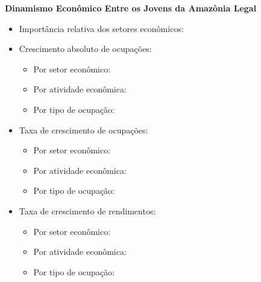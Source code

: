 \documentclass[10pt]{beamer}
\begin{document}
\begin{frame}[label=indice_principal_amz_jovem]{}

\textit{\hyperlink{indice_principal}{}}

\textbf{Dinamismo Econômico Entre os Jovens da Amazônia Legal}
\vspace{2mm}

\begin{itemize}

\item{Importância relativa dos setores econômicos: \hyperlink{_amz_jovem_importancia_relativa}{}}
\vspace{1mm}

\item{Crescimento  absoluto de ocupações:
	\begin{itemize}
	\item{Por setor econômico: \hyperlink{amzjovemrkngnocuporsetor}{}}
	\item{Por atividade econômica: \hyperlink{amzjovemrkngnocuporatividade}{}}
	\item{Por tipo de ocupação: \hyperlink{amzjovemrkngnocuporocupacao}{}}
	\end{itemize}
}
\vspace{1mm}

\item{Taxa de crescimento de ocupações:
	\begin{itemize}
	\item{Por setor econômico: \hyperlink{amzjovemrkngtxocuporsetor}{}}
	\item{Por atividade econômica: \hyperlink{amzjovemrkngtxocuporatividade}{}}
	\item{Por tipo de ocupação: \hyperlink{amzjovemrkngtxocuporocupacao}{}}
	\end{itemize}
}
\vspace{1mm}

\item{Taxa de crescimento de rendimentos:
	\begin{itemize}
	\item{Por setor econômico: \hyperlink{amzjovemrkngtxrendaporsetor}{}}
	\item{Por atividade econômica: \hyperlink{amzjovemrkngtxrendaporatividade}{}}
	\item{Por tipo de ocupação: \hyperlink{amzjovemrkngtxrendaporocupacao}{}}
	\end{itemize}
}
\vspace{1mm}

\end{itemize}

\end{frame}
\end{document}
